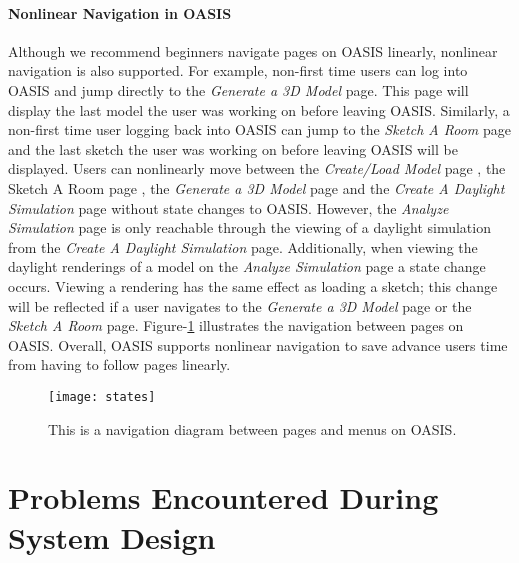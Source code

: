 \paragraph{Nonlinear Navigation in OASIS}
Although we recommend beginners navigate pages on OASIS linearly, nonlinear navigation is also supported. For example, non-first time users can log into OASIS and jump directly to the \textit{Generate a 3D Model} page. This page will display the last model the user was working on before leaving OASIS. Similarly, a non-first time user logging back into OASIS can jump to the \textit{Sketch A Room} page and the last sketch the user was working on before leaving OASIS will be displayed. 
Users can nonlinearly move between the \textit{Create/Load Model} page ,  the {Sketch A Room} page , the \textit{Generate a 3D Model} page and the \textit{Create A Daylight Simulation} page without state changes to OASIS. However, the \textit{Analyze Simulation} page is only reachable through the viewing of a daylight simulation from the \textit{Create A Daylight Simulation} page. Additionally, when viewing the daylight renderings of a model on the \textit{Analyze Simulation} page a state change occurs. Viewing a rendering has the same effect as loading a sketch; this change will be reflected if a user navigates to the \textit{Generate a 3D Model} page or the \textit{Sketch A Room} page. Figure-\ref{fig:states} illustrates the navigation between pages on OASIS. Overall, OASIS supports nonlinear navigation to save advance users time from having to follow pages linearly.

\begin{figure}[h]
\centering
\texttt{[image: states]}
\caption{This is a navigation diagram between pages and menus on OASIS.}
\label{fig:states}
\end{figure}


\section{Problems Encountered During System Design}

